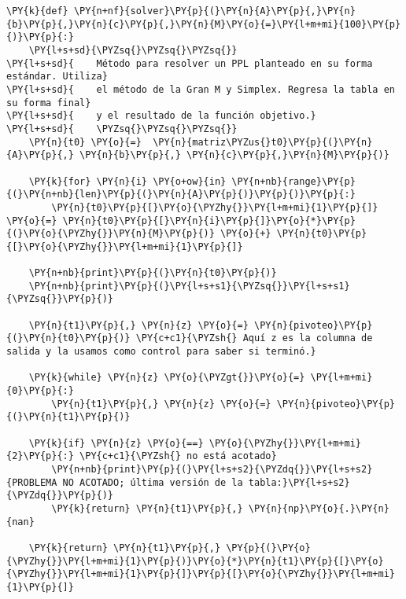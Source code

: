 \begin{tcolorbox}[breakable, size=fbox, boxrule=1pt, pad at break*=1mm,colback=cellbackground, colframe=cellborder]
\begin{Verbatim}[commandchars=\\\{\}]
\PY{k}{def} \PY{n+nf}{solver}\PY{p}{(}\PY{n}{A}\PY{p}{,}\PY{n}{b}\PY{p}{,}\PY{n}{c}\PY{p}{,}\PY{n}{M}\PY{o}{=}\PY{l+m+mi}{100}\PY{p}{)}\PY{p}{:}
    \PY{l+s+sd}{\PYZsq{}\PYZsq{}\PYZsq{}}
\PY{l+s+sd}{    Método para resolver un PPL planteado en su forma estándar. Utiliza}
\PY{l+s+sd}{    el método de la Gran M y Simplex. Regresa la tabla en su forma final}
\PY{l+s+sd}{    y el resultado de la función objetivo.}
\PY{l+s+sd}{    \PYZsq{}\PYZsq{}\PYZsq{}}
    \PY{n}{t0} \PY{o}{=}  \PY{n}{matriz\PYZus{}t0}\PY{p}{(}\PY{n}{A}\PY{p}{,} \PY{n}{b}\PY{p}{,} \PY{n}{c}\PY{p}{,}\PY{n}{M}\PY{p}{)}
    
    \PY{k}{for} \PY{n}{i} \PY{o+ow}{in} \PY{n+nb}{range}\PY{p}{(}\PY{n+nb}{len}\PY{p}{(}\PY{n}{A}\PY{p}{)}\PY{p}{)}\PY{p}{:}
        \PY{n}{t0}\PY{p}{[}\PY{o}{\PYZhy{}}\PY{l+m+mi}{1}\PY{p}{]} \PY{o}{=} \PY{n}{t0}\PY{p}{[}\PY{n}{i}\PY{p}{]}\PY{o}{*}\PY{p}{(}\PY{o}{\PYZhy{}}\PY{n}{M}\PY{p}{)} \PY{o}{+} \PY{n}{t0}\PY{p}{[}\PY{o}{\PYZhy{}}\PY{l+m+mi}{1}\PY{p}{]}
    
    \PY{n+nb}{print}\PY{p}{(}\PY{n}{t0}\PY{p}{)}
    \PY{n+nb}{print}\PY{p}{(}\PY{l+s+s1}{\PYZsq{}}\PY{l+s+s1}{\PYZsq{}}\PY{p}{)}
    
    \PY{n}{t1}\PY{p}{,} \PY{n}{z} \PY{o}{=} \PY{n}{pivoteo}\PY{p}{(}\PY{n}{t0}\PY{p}{)} \PY{c+c1}{\PYZsh{} Aquí z es la columna de salida y la usamos como control para saber si terminó.}
    
    \PY{k}{while} \PY{n}{z} \PY{o}{\PYZgt{}}\PY{o}{=} \PY{l+m+mi}{0}\PY{p}{:}
        \PY{n}{t1}\PY{p}{,} \PY{n}{z} \PY{o}{=} \PY{n}{pivoteo}\PY{p}{(}\PY{n}{t1}\PY{p}{)}
    
    \PY{k}{if} \PY{n}{z} \PY{o}{==} \PY{o}{\PYZhy{}}\PY{l+m+mi}{2}\PY{p}{:} \PY{c+c1}{\PYZsh{} no está acotado}
        \PY{n+nb}{print}\PY{p}{(}\PY{l+s+s2}{\PYZdq{}}\PY{l+s+s2}{PROBLEMA NO ACOTADO; última versión de la tabla:}\PY{l+s+s2}{\PYZdq{}}\PY{p}{)}
        \PY{k}{return} \PY{n}{t1}\PY{p}{,} \PY{n}{np}\PY{o}{.}\PY{n}{nan}
    
    \PY{k}{return} \PY{n}{t1}\PY{p}{,} \PY{p}{(}\PY{o}{\PYZhy{}}\PY{l+m+mi}{1}\PY{p}{)}\PY{o}{*}\PY{n}{t1}\PY{p}{[}\PY{o}{\PYZhy{}}\PY{l+m+mi}{1}\PY{p}{]}\PY{p}{[}\PY{o}{\PYZhy{}}\PY{l+m+mi}{1}\PY{p}{]}
\end{Verbatim}
\end{tcolorbox}